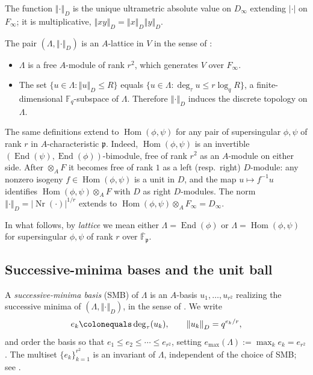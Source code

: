 \documentclass[12pt]{amsart}
\theoremstyle{definition}
\theoremstyle{remark}
\numberwithin{equation}{section}
\numberwithin{thm}{section}
\DeclareMathOperator{\Hom}{Hom}
\DeclareMathOperator{\End}{End}
\DeclareMathOperator{\Nr}{Nr}
\newcommand{\fp}{\mathfrak{p}}
\newcommand{\F}{\mathbb{F}}
\newcommand{\Fi}{F_\infty}
\newcommand{\oF}{\overline{\F}}
\newcommand{\La}{\Lambda}
\newcommand{\norm}[1]{\left\Vert#1\right\Vert}
\newcommand{\abs}[1]{\left|#1\right|}
\begin{document}
	The function $\norm{\cdot}_D$ is the unique ultrametric absolute value on $D_\infty$ extending $\abs{\cdot}$ on $\Fi$; it is multiplicative, $\norm{xy}_D=\norm{x}_D\norm{y}_D$.
	
	The pair $(\La, \norm{\cdot}_D)$ is an $A$-lattice in $V$ in the sense of \cite[Def.~1.3.2]{Mornev}:
	\begin{itemize}
		\item $\La$ is a free $A$-module of rank $r^2$, which generates $V$ over $\Fi$.
		\item The set $\{u \in \La : \norm{u}_D \leq R\}$ equals $\{u \in \La : \deg_\tau u \leq r \log_q R\}$, a finite-dimensional $\F_q$-subspace of $\La$. Therefore $\norm{\cdot}_D$ induces the discrete topology on $\La$.
	\end{itemize}
	
	The same definitions extend to $\Hom(\phi,\psi)$ for any pair of supersingular $\phi, \psi$ of rank $r$ in $A$-characteristic $\fp$. Indeed, $\Hom(\phi,\psi)$ is an invertible $(\End(\psi), \End(\phi))$-bimodule, free of rank $r^2$ as an $A$-module on either side. After $\otimes_A F$ it becomes free of rank $1$ as a left (resp.\ right) $D$-module: any nonzero isogeny $f \in \Hom(\phi,\psi)$ is a unit in $D$, and the map $u \mapsto f^{-1} u$ identifies $\Hom(\phi,\psi) \otimes_A F$ with $D$ as right $D$-modules. The norm $\norm{\cdot}_D = \abs{\Nr(\cdot)}^{1/r}$ extends to $\Hom(\phi,\psi) \otimes_A \Fi = D_\infty$.
	
	In what follows, by \emph{lattice} we mean either $\La = \End(\phi)$ or $\La = \Hom(\phi,\psi)$ for supersingular $\phi, \psi$ of rank $r$ over $\oF_\fp$.
	
	\subsection{Successive-minima bases and the unit ball}\label{sub:smb-unit-ball}
	
	A \emph{successive-minima basis} (SMB) of $\La$ is an $A$-basis $u_1, \ldots, u_{r^2}$ realizing the successive minima of $(\La, \norm{\cdot}_D)$, in the sense of \cite[\S 4]{Taguchi}. We write
	\[
	e_k \colonequals \deg_\tau(u_k), \qquad \norm{u_k}_D = q^{e_k/r},
	\]
	and order the basis so that $e_1 \leq e_2 \leq \cdots \leq e_{r^2}$, setting $e_{\max}(\La) := \max_k e_k = e_{r^2}$. The multiset $\{e_k\}_{k=1}^{r^2}$ is an invariant of $\La$, independent of the choice of SMB; see \cite[Lem.~4.2]{Taguchi}.
	
\end{document}
